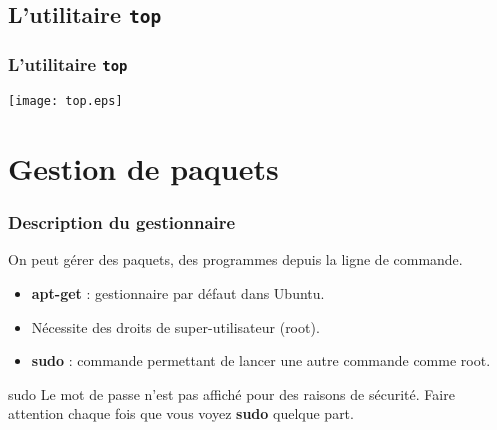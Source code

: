 \documentclass{beamer}
\begin{document}
    \subsection{L'utilitaire \texttt{top}}
    \begin{frame}
        \frametitle{L'utilitaire \texttt{top}}
        \texttt{[image: top.eps]}
    \end{frame}

    \section{Gestion de paquets}
    \begin{frame}
        \frametitle{Description du gestionnaire}
        On peut gérer des paquets, des programmes depuis la ligne de commande.
        \begin{itemize}
            \item {\bf apt-get} : gestionnaire par défaut dans Ubuntu.
            \item Nécessite des droits de super-utilisateur (root).
            \item {\bf sudo} : commande permettant de lancer une autre commande comme root.
        \end{itemize}
        \begin{block}{sudo}
            Le mot de passe n'est pas affiché pour des raisons de sécurité.\newline
            Faire attention chaque fois que vous voyez {\bf sudo} quelque part.
        \end{block}
    \end{frame}
\end{document}
